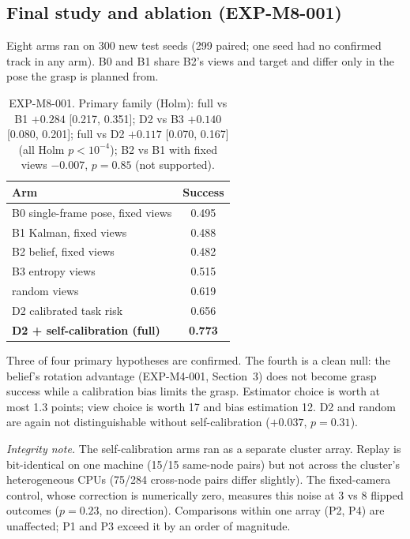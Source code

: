 \documentclass[10pt,twocolumn]{article}
\begin{document}
\subsection{Final study and ablation (EXP-M8-001)}\label{sec:m8}
Eight arms ran on 300 new test seeds (299 paired; one seed had no confirmed track in any arm).
B0 and B1 share B2's views and target and differ only in the pose the grasp is planned from.
\begin{table}[h]\centering\small
\begin{tabular}{lc}\toprule
Arm & Success\\\midrule
B0 single-frame pose, fixed views & 0.495\\
B1 Kalman, fixed views & 0.488\\
B2 belief, fixed views & 0.482\\
B3 entropy views & 0.515\\
random views & 0.619\\
D2 calibrated task risk & 0.656\\
\textbf{D2 + self-calibration (full)} & \textbf{0.773}\\\bottomrule
\end{tabular}
\caption{EXP-M8-001. Primary family (Holm): full vs B1 $+0.284$ [0.217, 0.351]; D2 vs B3
$+0.140$ [0.080, 0.201]; full vs D2 $+0.117$ [0.070, 0.167] (all Holm $p<10^{-4}$); B2 vs B1
with fixed views $-0.007$, $p=0.85$ (not supported).}
\end{table}
Three of four primary hypotheses are confirmed. The fourth is a clean null: the belief's rotation
advantage (EXP-M4-001, Section~3) does not become grasp success while a calibration bias limits the grasp.
Estimator choice is worth at most 1.3 points; view choice is worth 17 and bias estimation 12.
D2 and random are again not distinguishable without self-calibration ($+0.037$, $p=0.31$).

\emph{Integrity note.} The self-calibration arms ran as a separate cluster array. Replay is
bit-identical on one machine (15/15 same-node pairs) but not across the cluster's heterogeneous
CPUs (75/284 cross-node pairs differ slightly). The fixed-camera control, whose correction is
numerically zero, measures this noise at 3 vs 8 flipped outcomes ($p=0.23$, no direction).
Comparisons within one array (P2, P4) are unaffected; P1 and P3 exceed it by an order of
magnitude.
\end{document}
